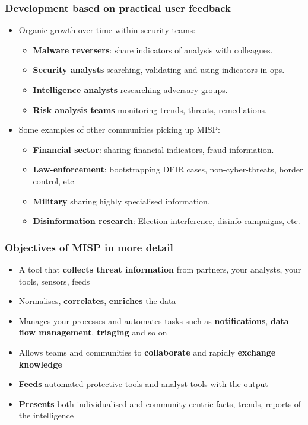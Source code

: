 \begin{frame}
\frametitle{Development based on practical user feedback}
\begin{itemize}
    \item Organic growth over time within security teams:
        \begin{itemize}
                \item {\bf Malware reversers}: share indicators of analysis with colleagues.
                \item {\bf Security analysts} searching, validating and using indicators in ops.
                \item {\bf Intelligence analysts} researching adversary groups.
                \item {\bf Risk analysis teams} monitoring trends, threats, remediations.
        \end{itemize}
    \item Some examples of other communities picking up MISP:
        \begin{itemize}
                \item {\bf Financial sector}: sharing financial indicators, fraud information.
                \item {\bf Law-enforcement}: bootstrapping DFIR cases, non-cyber-threats, border control, etc
                \item {\bf Military} sharing highly specialised information.
                \item {\bf Disinformation research}: Election interference, disinfo campaigns, etc.
        \end{itemize}
\end{itemize}
\end{frame}

\begin{frame}
\frametitle{Objectives of MISP in more detail}      
\begin{itemize}
       \item A tool that {\bf collects threat information} from partners, your analysts, your tools, sensors, feeds
       \item Normalises, {\bf correlates}, {\bf enriches} the data
       \item Manages your processes and automates tasks such as {\bf notifications}, {\bf data flow management}, {\bf triaging} and so on
       \item Allows teams and communities to {\bf collaborate} and rapidly {\bf exchange knowledge}
       \item {\bf Feeds} automated protective tools and analyst tools with the output
       \item {\bf Presents} both individualised and community centric facts, trends, reports of the intelligence
\end{itemize}
\end{frame}


